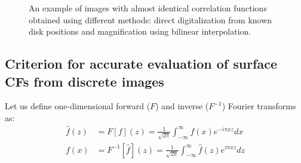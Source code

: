 \documentclass[reprint,amsmath,amssymb,aps,pre,showkeys,showpacs]{revtex4-1}
\begin{document}
\begin{figure}[!pt]
{    \label{fig:resized-sv}}
  \caption[]{An example of images with almost identical correlation functions
    obtained using different methods: direct digitalization from known disk
    positions and magnification using bilinear interpolation.}
  \label{fig:resized}
\end{figure}

\subsection{Criterion for accurate evaluation of surface CFs from discrete images}
\label{sec:crit}
Let us define one-dimensional forward ($F$) and inverse ($F^{-1}$) Fourier
transforms as:
\begin{align}
  \hat{f}(z) &= F[f](z) = \frac{1}{\sqrt{2\pi}}\int_{-\infty}^{\infty} f(x)
  e^{-i\pi xz} dx \label{eq:fourier-forward} \\
  f(x) &= F^{-1}[\hat{f}](z) = \frac{1}{\sqrt{2\pi}}\int_{-\infty}^{\infty} \hat{f}(z)
  e^{i\pi xz} dz \label{eq:fourier-backward}
\end{align}
\end{document}
